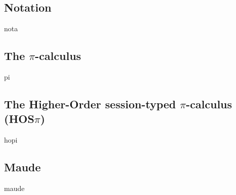 \subsection{Notation}
\label{nota}
{nota}
\subsection{The \texorpdfstring{$\pi$}{pi}-calculus}
\label{pisyn}
{pi}

\subsection{The Higher-Order session-typed \texorpdfstring{$\pi$}{pi}-calculus (HOS\texorpdfstring{$\pi$}{pi})}
\label{hopisyn}
{hopi}

\subsection{Maude}
\label{minmaude}
{maude}


